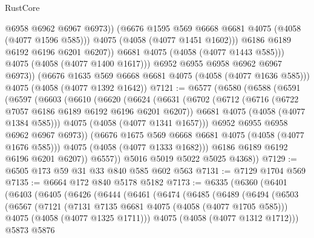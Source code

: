 \begin{lexlean}{RustCore}
\begin{coremodule}
                      @6958
                      @6962
                      @6967
                      @6973))
                  (@6676 @1595 @569 @6668 @6681 @4075 (@4058 (@4077 @1596 @585)))
                  @4075
                  (@4058 (@4077 @1451 @1602)))
                @6186
                @6189
                @6192
                @6196
                @6201
                @6207))
            @6681
            @4075
            (@4058 (@4077 @1443 @585)))
          @4075
          (@4058 (@4077 @1400 @1617)))
        @6952
        @6955
        @6958
        @6962
        @6967
        @6973))
    (@6676 @1635 @569 @6668 @6681 @4075 (@4058 (@4077 @1636 @585)))
    @4075
    (@4058 (@4077 @1392 @1642))
@7121 := @6577
    (@6580
      (@6588
        (@6591
          (@6597
            (@6603
              (@6610
                (@6620
                  (@6624
                    (@6631
                      (@6702
                        (@6712
                          (@6716 (@6722 @7057 @6186 @6189 @6192 @6196 @6201 @6207))
                          @6681
                          @4075
                          (@4058 (@4077 @1384 @585)))
                        @4075
                        (@4058 (@4077 @1341 @1657)))
                      @6952
                      @6955
                      @6958
                      @6962
                      @6967
                      @6973))
                  (@6676 @1675 @569 @6668 @6681 @4075 (@4058 (@4077 @1676 @585)))
                  @4075
                  (@4058 (@4077 @1333 @1682)))
                @6186
                @6189
                @6192
                @6196
                @6201
                @6207))
            @6557))
        @5016
        @5019
        @5022
        @5025
        @4368))
@7129 := @6505 @173 @59 @31 @33 @840 @585 @602 @563
@7131 := @7129 @1704 @569
@7135 := @6664 @172 @840 @5178 @5182
@7173 := @6335
    (@6360
      (@6401
        (@6403
          (@6405
            (@6426
              (@6444
                (@6461
                  (@6474
                    (@6485
                      (@6489
                        (@6494
                          (@6503
                            (@6567
                              (@7121
                                (@7131 @7135 @6681 @4075 (@4058 (@4077 @1705 @585)))
                                @4075
                                (@4058 (@4077 @1325 @1711)))
                              @4075
                              (@4058 (@4077 @1312 @1712)))
                            @5873
                            @5876

\end{coremodule}
\end{lexlean}
